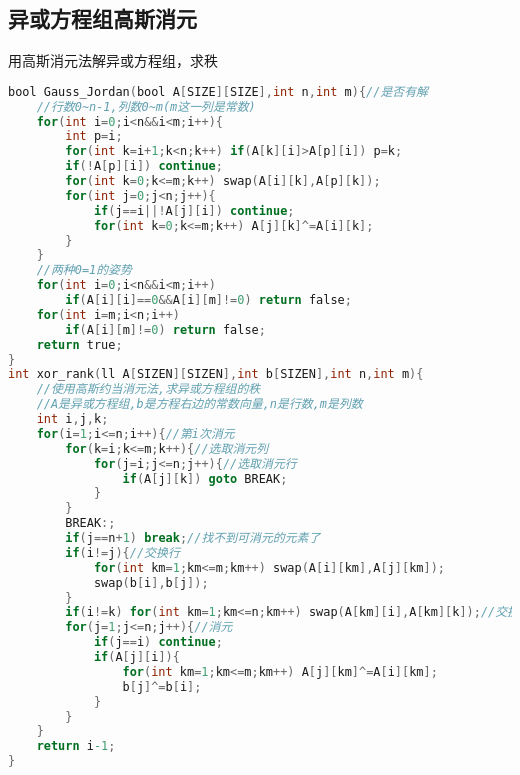 \subsection{异或方程组高斯消元}
用高斯消元法解异或方程组，求秩
\begin{lstlisting}[language=C]
bool Gauss_Jordan(bool A[SIZE][SIZE],int n,int m){//是否有解
	//行数0~n-1,列数0~m(m这一列是常数)
	for(int i=0;i<n&&i<m;i++){
		int p=i;
		for(int k=i+1;k<n;k++) if(A[k][i]>A[p][i]) p=k;
		if(!A[p][i]) continue;
		for(int k=0;k<=m;k++) swap(A[i][k],A[p][k]);
		for(int j=0;j<n;j++){
			if(j==i||!A[j][i]) continue;
			for(int k=0;k<=m;k++) A[j][k]^=A[i][k];
		}
	}
	//两种0=1的姿势
	for(int i=0;i<n&&i<m;i++)
		if(A[i][i]==0&&A[i][m]!=0) return false;
	for(int i=m;i<n;i++)
		if(A[i][m]!=0) return false;
	return true;
}
int xor_rank(ll A[SIZEN][SIZEN],int b[SIZEN],int n,int m){
	//使用高斯约当消元法,求异或方程组的秩
	//A是异或方程组,b是方程右边的常数向量,n是行数,m是列数
	int i,j,k;
	for(i=1;i<=n;i++){//第i次消元
		for(k=i;k<=m;k++){//选取消元列
			for(j=i;j<=n;j++){//选取消元行
				if(A[j][k]) goto BREAK;
			}
		}
		BREAK:;
		if(j==n+1) break;//找不到可消元的元素了
		if(i!=j){//交换行
			for(int km=1;km<=m;km++) swap(A[i][km],A[j][km]);
			swap(b[i],b[j]);
		}
		if(i!=k) for(int km=1;km<=n;km++) swap(A[km][i],A[km][k]);//交换列
		for(j=1;j<=n;j++){//消元
			if(j==i) continue;
			if(A[j][i]){
				for(int km=1;km<=m;km++) A[j][km]^=A[i][km];
				b[j]^=b[i];
			}
		}
	}
	return i-1;
}
\end{lstlisting}
